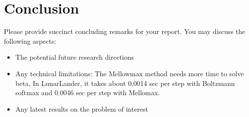 \section{Conclusion}
\label{section:conclusion}
Please provide succinct concluding remarks for your report. You may discuss the following aspects:
\begin{itemize}
    \item The potential future research directions
    \item Any technical limitations: The Mellowmax method needs more time to solve beta, In LunarLander,
    it takes about 0.0014 sec per step with Boltzmann softmax and 0.0046 sec per step with Mellomax.

    \item Any latest results on the problem of interest
\end{itemize}
